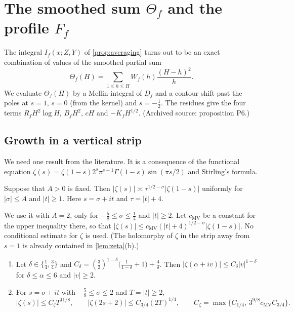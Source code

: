 \chapter{The smoothed sum \texorpdfstring{$\Theta_f$}{Theta\_f} and the profile \texorpdfstring{$F_f$}{F\_f}}\label{ch:mellin}

The integral $I_f(x;Z,Y)$ of \cref{prop:averaging} turns out to be an exact combination of values of the smoothed partial sum
\[
\Theta_f(H)=\sum_{1\le h\le H}W_f(h)\frac{(H-h)^2}{h}.
\]
We evaluate $\Theta_f(H)$ by a Mellin integral of $D_f$ and a contour shift past the poles at $s=1$, $s=0$ (from the kernel) and $s=-\frac12$. The residues give the four terms $R_fH^2\log H$, $B_fH^2$, $cH$ and $-K_fH^{1/2}$. (Archived source: proposition P6.)

\section{Growth in a vertical strip}

We need one result from the literature. It is a consequence of the functional equation $\zeta(s)=\zeta(1-s)2^s\pi^{s-1}\Gamma(1-s)\sin(\pi s/2)$ \cite[Corollary~10.4]{montgomeryvaughan2007} and Stirling's formula.

\begin{quoted}\label{quoted:mv}
Suppose that $A>0$ is fixed. Then $|\zeta(s)|\asymp\tau^{1/2-\sigma}|\zeta(1-s)|$ uniformly for $|\sigma|\le A$ and $|t|\ge1$. Here $s=\sigma+it$ and $\tau=|t|+4$.
\end{quoted}

We use it with $A=2$, only for $-\frac58\le\sigma\le\frac14$ and $|t|\ge2$. Let $c_{\mathrm{MV}}$ be a constant for the upper inequality there, so that $|\zeta(s)|\le c_{\mathrm{MV}}(|t|+4)^{1/2-\sigma}|\zeta(1-s)|$. No conditional estimate for $\zeta$ is used. (The holomorphy of $\zeta$ in the strip away from $s=1$ is already contained in \cref{lem:zeta}(b).)

\begin{lemma}\label{lem:zeta-growth}
\begin{enumerate}[label=(\alph*)]
\item Let $\delta\in\{\frac14,\frac34\}$ and $C_\delta=(\frac32)^{1-\delta}\bigl(\frac1{1-\delta}+1\bigr)+\frac4\delta$. Then $|\zeta(\alpha+iv)|\le C_\delta|v|^{1-\delta}$ for $\delta\le\alpha\le6$ and $|v|\ge2$.
\item For $s=\sigma+it$ with $-\frac58\le\sigma\le2$ and $T=|t|\ge2$,
\[
|\zeta(s)|\le C_\zeta T^{11/8},\qquad|\zeta(2s+2)|\le C_{3/4}(2T)^{1/4},\qquad C_\zeta=\max\{C_{1/4},\,3^{9/8}c_{\mathrm{MV}}C_{3/4}\}.
\]
\end{enumerate}
\end{lemma}

